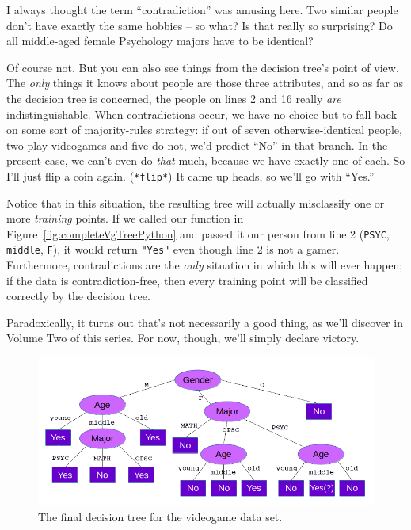 I always thought the term ``contradiction'' was amusing here. Two similar
people don't have exactly the same hobbies -- so what? Is that really so
surprising? Do all middle-aged female Psychology majors have to be identical?

Of course not. But you can also see things from the decision tree's point of
view. The \textit{only} things it knows about people are those three
attributes, and so as far as the decision tree is concerned, the people on
lines 2 and 16 really \textit{are} indistinguishable. When contradictions
occur, we have no choice but to fall back on some sort of majority-rules
strategy: if out of seven otherwise-identical people, two play videogames and
five do not, we'd predict ``No'' in that branch. In the present case, we can't
even do \textit{that} much, because we have exactly one of each. So I'll just
flip a coin again. (\texttt{*flip*}) It came up heads, so we'll go with
``Yes.''

Notice that in this situation, the resulting tree will actually misclassify one
or more \textit{training} points. If we called our function in
Figure~\ref{fig:completeVgTreePython} and passed it our person from line 2
(\texttt{\textquotesingle PSYC\textquotesingle}, \texttt{\textquotesingle
middle\textquotesingle}, \texttt{\textquotesingle F\textquotesingle}), it would
return \texttt{"Yes"} even though line 2 is not a gamer. Furthermore,
contradictions are the \textit{only} situation in which this will ever happen;
if the data is contradiction-free, then every training point will be classified
correctly by the decision tree.

Paradoxically, it turns out that's not necessarily a good thing, as we'll
discover in Volume Two of this series. For now, though, we'll simply declare
victory.

\begin{figure}[ht]
\centering
\includegraphics[width=1\textwidth]{completeVgTree.png}
\caption{The final decision tree for the videogame data set.}
\label{fig:completeVgTree}
\end{figure}

